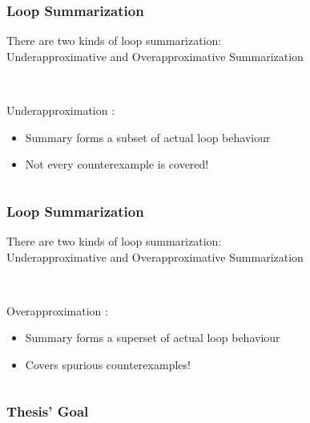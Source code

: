 \begin{frame}[t]
	\frametitle{Loop Summarization}
	\begin{center}
		There are two kinds of loop summarization: \\
		\onslide<+-> \color{emblue}Underapproximative \color{black} and \color{emblue}Overapproximative \color{black} Summarization
		\begin{columns}[t]
			\begin{column}{0.35\textwidth}
				\vspace*{0.5cm} \\
				\onslide<+-> \color{emblue} Underapproximation \color{black}:
				\begin{itemize}
					\onslide<+-> \item Summary forms a subset of actual loop behaviour
					\item Not every counterexample is covered!
				\end{itemize}
			\end{column}
			\begin{column}{0.5\textwidth}
				\vspace*{0.5cm}
				\resizebox{\textwidth}{!}{}
			\end{column}
		\end{columns}
	\end{center}
\end{frame}

\begin{frame}[t]
	\frametitle{Loop Summarization}
	\begin{center}
		There are two kinds of loop summarization: \\
		\onslide<+-> \color{emblue}Underapproximative \color{black} and \color{emblue}Overapproximative \color{black} Summarization
		\begin{columns}[t]
			\begin{column}{0.35\textwidth}
				\vspace*{0.5cm} \\
				\onslide<+-> \color{emblue} Overapproximation \color{black}:
				\begin{itemize}
					\onslide<+-> \item Summary forms a superset of actual loop behaviour
					\onslide<+-> \item Covers spurious counterexamples!
				\end{itemize}
			\end{column}
			\begin{column}{0.5\textwidth}
				\vspace*{0.5cm}
				\resizebox{\textwidth}{!}{}
			\end{column}
		\end{columns}
	\end{center}
\end{frame}

\begin{frame}[t]
	\frametitle{Thesis' Goal}
\end{frame}